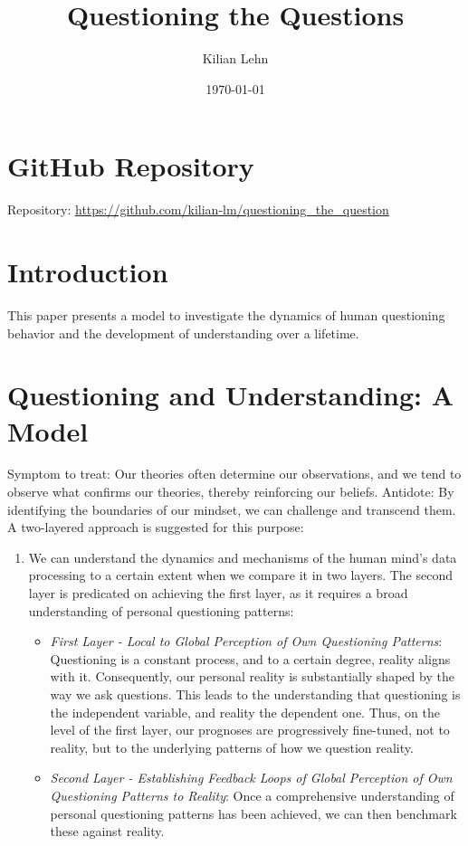 \documentclass{article}
\begin{document}
    \title{Questioning the Questions}
    \author{Kilian Lehn}
    \date{\today}
    \maketitle

    \section*{GitHub Repository}
    Repository: \href{https://github.com/kilian-lm/questioning_the_question}{https://github.com/kilian-lm/questioning\_the\_question}
    \label{sec:repository}

    \tableofcontents
    \clearpage


    \section{Introduction}

    This paper presents a model to investigate the dynamics of human questioning behavior and the development of understanding over a lifetime.


    \section{Questioning and Understanding: A Model}
    \label{sec:model}
    Symptom to treat: Our theories often determine our observations, and we tend to observe what confirms our theories, thereby reinforcing our beliefs.
    Antidote: By identifying the boundaries of our mindset, we can challenge and transcend them.
    A two-layered approach is suggested for this purpose:
    \begin{enumerate}
        \item We can understand the dynamics and mechanisms of the human mind's data processing to a certain extent when we compare it in two layers. The second layer is predicated on achieving the first layer, as it requires a broad understanding of personal questioning patterns:
        \begin{itemize}
            \item \textit{First Layer - Local to Global Perception of Own Questioning Patterns}: Questioning is a constant process, and to a certain degree, reality aligns with it. Consequently, our personal reality is substantially shaped by the way we ask questions. This leads to the understanding that questioning is the independent variable, and reality the dependent one. Thus, on the level of the first layer, our prognoses are progressively fine-tuned, not to reality, but to the underlying patterns of how we question reality.
            \item \textit{Second Layer - Establishing Feedback Loops of Global Perception of Own Questioning Patterns to Reality}: Once a comprehensive understanding of personal questioning patterns has been achieved, we can then benchmark these against reality.
        \end{itemize}
    \end{enumerate}
    \label{sec:assumptions}
\end{document}
